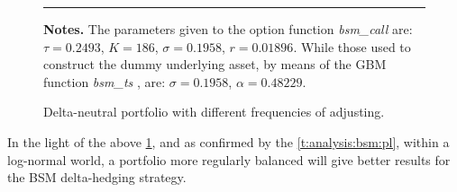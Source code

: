 \documentclass[12pt]{report}
\begin{document}
\begin{figure}[h]
  \centering
  \rule{40mm}{20mm}
  \caption{Delta-neutral portfolio with different frequencies of adjusting.}
  \begin{changemargin}{0.5cm}{0.5cm}
  \medskip
\footnotesize
{}\textbf{Notes.} The parameters given to the option function \textit{bsm\_call} are: $\tau = 0.2493$, $K = 186$, $\sigma = 0.1958$, $r = 0.01896$. While those used to construct the dummy underlying asset, by means of the GBM function \textit{bsm\_ts} , are: $\sigma = 0.1958$, $\alpha = 0.48229$.
  \end{changemargin}
  \label{p:analysis:gbm:hedges}
\end{figure}

In the light of the above \cref{p:analysis:gbm:hedges}, and as confirmed by the \cref{t:analysis:bsm:pl}, within a log-normal world, a portfolio more regularly balanced will give better results for the BSM delta-hedging strategy.
    
\end{document}

